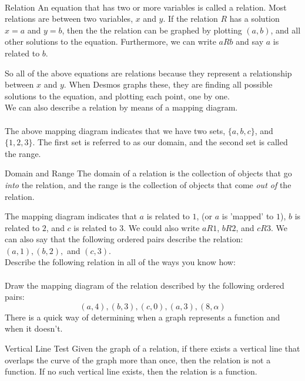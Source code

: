 \documentclass[12pt,fleqn]{book}
\begin{document}
\\[1em]
\begin{defn}{Relation}{}
    An equation that has two or more variables is called a relation.  Most relations are between two variables, $x$ and $y$.  If the relation $R$ has a solution $x=a$ and $y=b$, then the the relation can be graphed by plotting $(a,b)$, and all other solutions to the equation.  Furthermore, we can write $a R b$ and say $a$ is related to $b$.
\end{defn}
So all of the above equations are relations because they represent a relationship between $x$ and $y$.  When Desmos graphs these, they are finding all possible solutions to the equation, and plotting each point, one by one.
\\[1em]
We can also describe a relation by means of a mapping diagram.
\\[1em]
\\[1em]
The above mapping diagram indicates that we have two sets, $\{a, b, c\}$, and $\{1, 2, 3\}$.
The first set is referred to as our domain, and the second set is called the range.
\begin{defn}{Domain and Range}{}
    The domain of a relation is the collection of objects that go \emph{into} the relation, and the range is the collection of objects that come \emph{out of} the relation.
\end{defn}
The mapping diagram indicates that $a$ is related to $1$, (or $a$ is 'mapped' to $1$), $b$ is related to $2$, and $c$ is related to $3$.  We could also write $aR1$, $bR2$, and $cR3$.  We can also say that the following ordered pairs describe the relation: $(a,1), (b,2),$ and $(c,3)$.
\\[1em]
Describe the following relation in all of the ways you know how:
\\[1em]
\\[1em]
Draw the mapping diagram of the relation described by the following ordered pairs:
\[
    (a,4),(b,3),(c,0),(a,3),(8,\alpha)
\]
There is a quick way of determining when a graph represents a function and when it doesn't.
\begin{defn}{Vertical Line Test}{}
    Given the graph of a relation, if there exists a vertical line that overlaps the curve of the graph more than once, then the relation is not a function.  If no such vertical line exists, then the relation is a function.
\end{defn}
\end{document}

